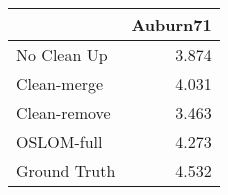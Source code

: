 \begin{tabular}{lr}
\toprule
{} & Auburn71 \\
\midrule
No Clean Up  &    3.874 \\
Clean-merge  &    4.031 \\
Clean-remove &    3.463 \\
OSLOM-full   &    4.273 \\
Ground Truth &    4.532 \\
\bottomrule
\end{tabular}
